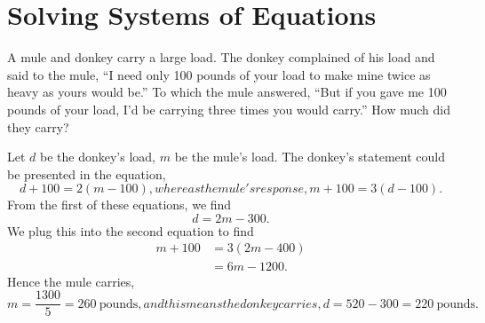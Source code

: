 \section{Solving Systems of Equations}

\begin{example}
A mule and donkey carry a large load. The donkey complained of his load
and said to the mule, ``I need only 100 pounds of your load to make mine
twice as heavy as yours would be.'' To which the mule answered, ``But if you gave
me 100 pounds of your load, I'd be carrying three times you would
carry.''
How much did they carry?

Let $d$ be the donkey's load, $m$ be the mule's load. The donkey's
statement could be presented in the equation,
\begin{subequations}
\begin{equation}
d + 100 = 2(m - 100),
\end{equation}
whereas the mule's response,
\begin{equation}
m + 100 = 3(d - 100).
\end{equation}
\end{subequations}
From the first of these equations, we find
\begin{equation}
d = 2m - 300.
\end{equation}
We plug this into the second equation to find
\begin{equation}
\begin{split}
  m + 100 &= 3(2m - 400)\\
  &= 6m - 1200.
\end{split}
\end{equation}
Hence the mule carries,
\begin{subequations}
\begin{equation}
m = \frac{1300}{5} = 260~\mbox{pounds},
\end{equation}
and this means the donkey carries,
\begin{equation}
d = 520 - 300 = 220~\mbox{pounds}.
\end{equation}
\end{subequations}
\end{example}

